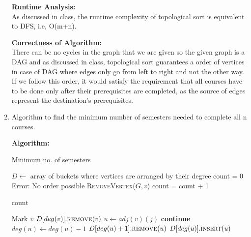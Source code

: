 \documentclass[a4paper]{article}
\begin{document}
\begin{enumerate}[1.]
    \textbf{Runtime Analysis:}\\
    As discussed in class, the runtime complexity of topological sort is equivalent to DFS, i.e, O(m+n).
    
    \textbf{Correctness of Algorithm:}\\
    There can be no cycles in the graph that we are given so the given graph is a DAG and as discussed in class, topological sort guarantees a order of vertices in case of DAG where edges only go from left to right and not the other way. If we follow this order, it would satisfy the requirement that all courses have to be done only after their prerequisites are completed, as the source of edges represent the destination's prerequisites.
    
    \hfill\qedsymbol
    
\newpage
\item Algorithm to find the minimum number of semesters needed to complete
all n courses.

\textbf{Algorithm:}
    
    {\centering
    \begin{minipage}{\linewidth}
    \begin{algorithm}[H]
    \caption{Minimum no. of semesters}\label{alg:ms}
    \begin{algorithmic}[1]
    \State $D \gets$ array of buckets where vertices are arranged by their degree
    \State count = 0
            \State \Return Error: No order possible
        \EndIf
            \State \textsc{RemoveVertex}($G,v$)
        \EndFor
        \State count = count + 1
    

    \EndWhile
    \State \Return count
    
    \EndProcedure
    
    \State Mark $v$ 
    \State $D[deg(v)].\textsc{remove}(v)$
    \State $u \gets adj(v)(j)$
    \State \textbf{continue}
    \EndIf
    \State $deg(u) \gets deg(u)-1$
    \State $D[deg(u)+1].\textsc{remove}(u)$
    \State $D[deg(u)].\textsc{insert}(u)$
    \EndFor
    \EndProcedure
    \end{algorithmic}
    \end{algorithm}
    \end{minipage}
    \par}
    

\end{enumerate}
\end{document}
